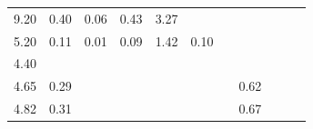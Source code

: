 \begin{refsection}[referencesCh3]
\begin{table}
\begin{adjustbox}{scale=0.65,center}
\begin{tabular}{@{}ccccccccccc@{}}
		9.20                                                         & 0.40                                                & 0.06                                                & 0.43                                                & 3.27                                                &                                                      &                                                     &                                                       &                                                         &                                                      & \cite{Moller2}        \\
		5.20                                                         & 0.11                                                & 0.01                                                & 0.09                                                & 1.42                                                & 0.10                                                 &                                                     &                                                       &                                                         &                                                      & \cite{Walsh}         \\
		4.40                                                         &                                                     &                                                     &                                                     &                                                     &                                                      &                                                     &                                                       &                                                         &                                                      & \cite{Zheng}                                 \\
		4.65                                                         & 0.29                                                &                                                     &                                                     &                                                     &                                                      &                                                     & 0.62                                                  &                                                         &                                                      & \cite{Sorensen}                                           \\
		4.82                                                         & 0.31                                                &                                                     &                                                     &                                                     &                                                      &                                                     & 0.67                                                  &                                                         &                                                      & \cite{Sorensen}                                           \\

\end{tabular}
\end{adjustbox}
\end{table}
\end{refsection}
